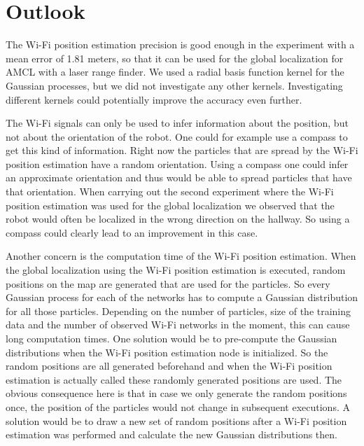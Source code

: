\chapter{Outlook} %
\label{Chapter6}

The Wi-Fi position estimation precision is good enough in the experiment with a mean error of 1.81 meters, so that it can be used for the global localization for AMCL with a laser range finder. We used a radial basis function kernel for the Gaussian processes, but we did not investigate any other kernels. Investigating different kernels could potentially improve the accuracy even further.
 
The Wi-Fi signals can only be used to infer information about the position, but not about the orientation of the robot. One could for example use a compass to get this kind of information. Right now the particles that are spread by the Wi-Fi position estimation have a random orientation. Using a compass one could infer an approximate orientation and thus would be able to spread particles that have that orientation. When carrying out the second experiment where the Wi-Fi position estimation was used for the global localization we observed that the robot would often be localized in the wrong direction on the hallway. So using a compass could clearly lead to an improvement in this case. 

Another concern is the computation time of the Wi-Fi position estimation. When the global localization using the Wi-Fi position estimation is executed, random positions on the map are generated that are used for the particles. So every Gaussian process for each of the networks has to compute a Gaussian distribution for all those particles. Depending on the number of particles, size of the training data and the number of observed Wi-Fi networks in the moment, this can cause long computation times. One solution would be to pre-compute the Gaussian distributions when the Wi-Fi position estimation node is initialized. So the random positions are all generated beforehand and when the Wi-Fi position estimation is actually called these randomly generated positions are used. The obvious consequence here is that in case we only generate the random positions once, the position of the particles would not change in subsequent executions. A solution would be to draw a new set of random positions after a Wi-Fi position estimation was performed and calculate the new Gaussian distributions then. 

